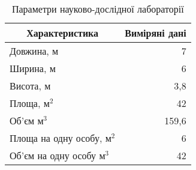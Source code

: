 \begin{table}[H]
\centering
\caption{Параметри науково-дослідної лабораторії}
\label{tab:room}
\begin{tabular}{|l|r|}
\hline
\multicolumn{1}{|c|}{Характеристика} & \multicolumn{1}{c|}{Виміряні дані} \\ \hline
Довжина, м & 7 \\ \hline
Ширина, м & 6 \\ \hline
Висота, м & 3,8 \\ \hline
Площа, м$^{2}$ & 42 \\ \hline
Об’єм м$^{3}$ & 159,6 \\ \hline
Площа на одну особу, м$^{2}$ & 6 \\ \hline
Об’єм на одну особу м$^{3}$ & 42 \\ \hline
\end{tabular}
\end{table}